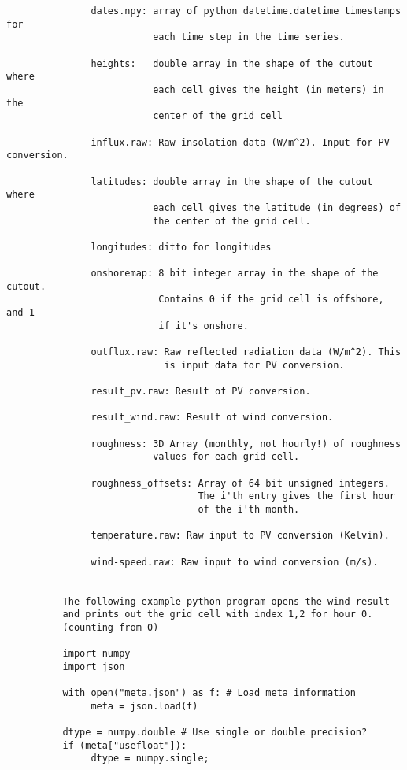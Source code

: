 \begin{verbatim}
               dates.npy: array of python datetime.datetime timestamps for
                          each time step in the time series.

               heights:   double array in the shape of the cutout where
                          each cell gives the height (in meters) in the
                          center of the grid cell

               influx.raw: Raw insolation data (W/m^2). Input for PV conversion.

               latitudes: double array in the shape of the cutout where
                          each cell gives the latitude (in degrees) of
                          the center of the grid cell.

               longitudes: ditto for longitudes

               onshoremap: 8 bit integer array in the shape of the cutout.
                           Contains 0 if the grid cell is offshore, and 1 
                           if it's onshore.

               outflux.raw: Raw reflected radiation data (W/m^2). This
                            is input data for PV conversion.

               result_pv.raw: Result of PV conversion.

               result_wind.raw: Result of wind conversion.

               roughness: 3D Array (monthly, not hourly!) of roughness
                          values for each grid cell.

               roughness_offsets: Array of 64 bit unsigned integers.
                                  The i'th entry gives the first hour 
                                  of the i'th month.
               
               temperature.raw: Raw input to PV conversion (Kelvin).
               
               wind-speed.raw: Raw input to wind conversion (m/s).


          The following example python program opens the wind result
          and prints out the grid cell with index 1,2 for hour 0.
          (counting from 0)

          import numpy
          import json

          with open("meta.json") as f: # Load meta information
               meta = json.load(f)

          dtype = numpy.double # Use single or double precision?
          if (meta["usefloat"]):
               dtype = numpy.single;
    

\end{verbatim}
